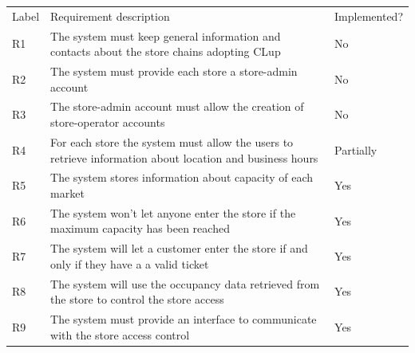 \renewcommand{\arraystretch}{1.3}
\begin{tabular}{C{1cm}L{11cm}C{3.1cm}}
    Label & Requirement description                                                                                                                                                                     & Implemented? \\

    R1    & The system must keep general information and contacts about the store chains adopting CLup                                                                                                  & No           \\
    R2    & The system must provide each store a store-admin account                                                                                                                                    & No           \\
    R3    & The store-admin account must allow the creation of store-operator accounts                                                                                                                  & No           \\
    R4    & For each store the system must allow the users to retrieve information about location and business hours                                                                                    & Partially    \\
    R5    & The system stores information about capacity of each market                                                                                                                                 & Yes          \\
    R6    & The system won't let anyone enter the store if the maximum capacity has been reached                                                                                                        & Yes          \\
    R7    & The system will let a customer enter the store if and only if they have a a valid ticket                                                                                                    & Yes          \\
    R8    & The system will use the occupancy data retrieved from the store to control the store access                                                                                                 & Yes          \\
    R9    & The system must provide an interface to communicate with the store access control                                                                                                           & Yes          \\

\end{tabular}
